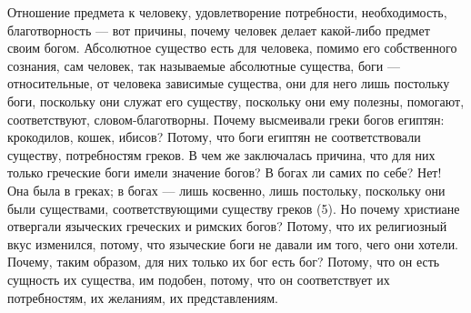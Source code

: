 \documentclass[12pt]{article}
\begin{document}
Отношение предмета к человеку, удовлетворение потребности, необходимость, благотворность --- вот причины, почему человек делает какой-либо предмет своим богом. Абсолютное существо есть для человека, помимо его собственного сознания, сам человек, так называемые абсолютные существа, боги --- относительные, от человека зависимые существа, они для него лишь постольку боги, поскольку они служат его существу, поскольку они ему полезны, помогают, соответствуют, словом-благотворны. Почему высмеивали греки богов египтян: крокодилов, кошек, ибисов? Потому, что боги египтян не соответствовали существу, потребностям греков. В чем же заключалась причина, что для них только греческие боги имели значение богов? В богах ли самих по себе? Нет! Она была в греках; в богах --- лишь косвенно, лишь постольку, поскольку они были существами, соответствующими существу греков (5). Но почему христиане отвергали языческих греческих и римских богов? Потому, что их религиозный вкус изменился, потому, что языческие боги не давали им того, чего они хотели. Почему, таким образом, для них только их бог есть бог? Потому, что он есть сущность их существа, им подобен, потому, что он соответствует их потребностям, их желаниям, их представлениям. 
\end{document}
